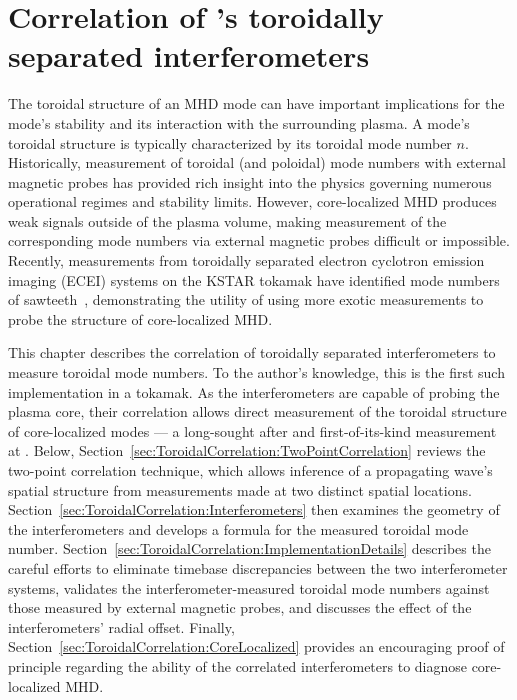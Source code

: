 \chapter{Correlation of \diiid's toroidally separated interferometers}
\label{ch:ToroidalCorrelation}
The toroidal structure of an MHD mode can have important implications
for the mode's stability and its interaction with the surrounding plasma.
A mode's toroidal structure is typically characterized
by its toroidal mode number $n$.
Historically, measurement of toroidal (and poloidal) mode numbers
with external magnetic probes has provided rich insight
into the physics governing numerous operational regimes and stability limits.
However, core-localized MHD produces weak signals outside of the plasma volume,
making measurement of the corresponding mode numbers
via external magnetic probes difficult or impossible.
Recently, measurements from toroidally separated
electron cyclotron emission imaging (ECEI) systems
on the KSTAR tokamak have identified mode numbers of
sawteeth~\cite{choe_nf_2015},
demonstrating the utility of using more exotic measurements
to probe the structure of core-localized MHD.

This chapter describes the correlation
of toroidally separated interferometers
to measure toroidal mode numbers.
To the author's knowledge,
this is the first such implementation in a tokamak.
As the interferometers are capable of probing the plasma core,
their correlation allows direct measurement
of the toroidal structure of core-localized modes
--- a long-sought after and first-of-its-kind measurement at \diiid.
Below, Section~\ref{sec:ToroidalCorrelation:TwoPointCorrelation}
reviews the two-point correlation technique,
which allows inference of a propagating wave's
spatial structure from measurements
made at two distinct spatial locations.
Section~\ref{sec:ToroidalCorrelation:Interferometers}
then examines the geometry of the interferometers and
develops a formula for the measured toroidal mode number.
Section~\ref{sec:ToroidalCorrelation:ImplementationDetails}
describes the careful efforts to eliminate timebase discrepancies
between the two interferometer systems,
validates the interferometer-measured toroidal mode numbers
against those measured by external magnetic probes, and
discusses the effect of the interferometers' radial offset.
Finally, Section~\ref{sec:ToroidalCorrelation:CoreLocalized}
provides an encouraging proof of principle
regarding the ability of the correlated interferometers
to diagnose core-localized MHD.


